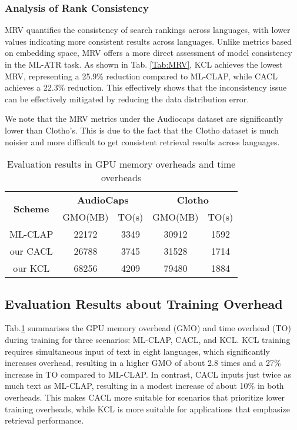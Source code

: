 \subsubsection{Analysis of Rank Consistency}
MRV quantifies the consistency of search rankings across languages, with lower values indicating more consistent results across languages. Unlike metrics based on embedding space, MRV offers a more direct assessment of model consistency in the ML-ATR task. As shown in Tab. \ref{Tab:MRV}, KCL achieves the lowest MRV, representing a 25.9\% reduction compared to ML-CLAP, while CACL achieves a 22.3\% reduction. This effectively shows that the inconsistency issue can be effectively mitigated by reducing the data distribution error.

We note that the MRV metrics under the Audiocaps dataset are significantly lower than Clotho's. This is due to the fact that the Clotho dataset is much noisier and more difficult to get consistent retrieval results across languages.

\begin{table}[ht]
\caption{Evaluation results in GPU memory overheads and time overheads}
\small
\centering
\begin{tabular}{c|cc|cc}
\hline
\multirow{2}{*}{\textbf{Scheme}} & \multicolumn{2}{c|}{\textbf{AudioCaps}} & \multicolumn{2}{c}{\textbf{Clotho}} \\ \cline{2-5}
 & GMO(MB) & TO(s) & GMO(MB) & TO(s)\\ \hline
ML-CLAP & 22172 & 3349 & 30912 & 1592\\ \hline
our CACL & 26788 & 3745 & 31528 & 1714\\ \hline
our KCL & 68256 & 4209 & 79480 & 1884\\ \hline
\end{tabular}
\label{Tab:overhead}
\end{table}

\subsection{Evaluation Results about Training Overhead}
Tab.\ref{Tab:overhead} summarises the GPU memory overhead (GMO) and time overhead (TO) during training for three scenarios: ML-CLAP, CACL, and KCL. KCL training requires simultaneous input of text in eight languages, which significantly increases overhead, resulting in a higher GMO of about 2.8 times and a 27\% increase in TO compared to ML-CLAP. In contrast, CACL inputs just twice as much text as ML-CLAP, resulting in a modest increase of about 10\% in both overheads. This makes CACL more suitable for scenarios that prioritize lower training overheads, while KCL is more suitable for applications that emphasize retrieval performance.